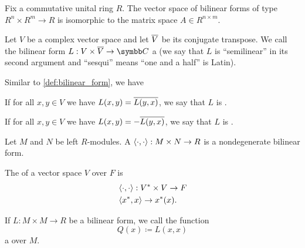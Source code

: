 \begin{corollary}\label{thm:bilinear_forms_isomorphic_to_matrices}
  Fix a commutative unital ring \( R \). The vector space of bilinear forms of type \( R^n \times R^m \to R \) is isomorphic to the matrix space \( A \in R^{n \times m} \).
\end{corollary}

\begin{definition}\label{def:sesquilinear_form}\cite[258]{Knapp2016BAlg}
  Let \( V \) be a complex vector space and let \( \overline{V} \) be its conjugate transpose. We call the bilinear form \( L: V \times \Ol V \to \BB{C} \) a  (we say that \( L \) is \enquote{semilinear} in its second argument and \enquote{sesqui} means \enquote{one and a half} is Latin).

  Similar to \cref{def:bilinear_form}, we have
  \begin{defenum}
     If for all \( x, y \in V \) we have \( L(x, y) = \overline{L(y, x)} \), we say that \( L \) is .

     If for all \( x, y \in V \) we have \( L(x, y) = -\overline{L(y, x)} \), we say that \( L \) is .
  \end{defenum}
\end{definition}

\begin{definition}\label{def:duality_pairing}
  Let \( M \) and \( N \) be left \( R \)-modules. A  \( \left\langle \cdot, \cdot \right\rangle: M \times N \to R \) is a nondegenerate bilinear form.

  The  of a vector space \( V \) over \( F \) is
  \begin{align*}
    &\left\langle \cdot, \cdot \right\rangle: V^* \times V \to F \\
    &\left\langle x^*, x \right\rangle \to x^*(x).
  \end{align*}
\end{definition}

\begin{definition}\label{def:quadratic_form}
  If \( L: M \times M \to R \) be a bilinear form, we call the function
  \begin{equation*}
    Q(x) \coloneqq L(x, x)
  \end{equation*}
  a  over \( M \).
\end{definition}

